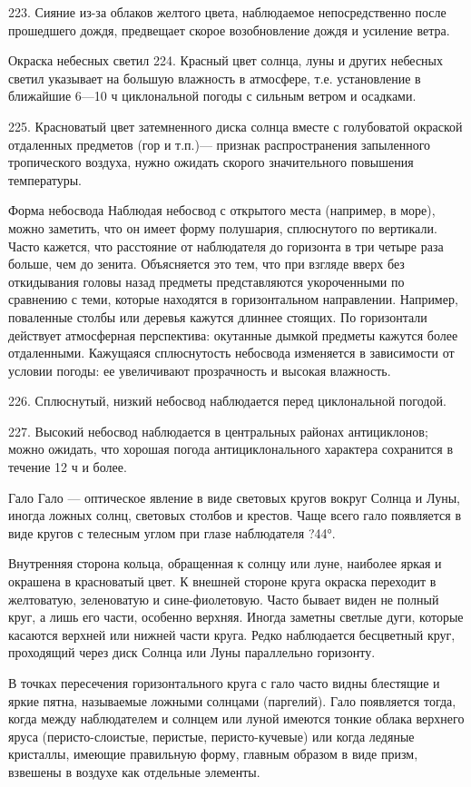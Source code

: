 223. Сияние из-за облаков желтого цвета, наблюдаемое непосредственно после прошедшего дождя, предвещает скорое возобновление дождя и усиление ветра.

Окраска небесных светил
224. Красный цвет солнца, луны и других небесных светил указывает на большую влажность в атмосфере, т.е. установление в ближайшие 6—10 ч циклональной погоды с сильным ветром и осадками.

225. Красноватый цвет затемненного диска солнца вместе с голубоватой окраской отдаленных предметов (гор и т.п.)— признак распространения запыленного тропического воздуха, нужно ожидать скорого значительного повышения температуры.

Форма небосвода
Наблюдая небосвод с открытого места (например, в море), можно заметить, что он имеет форму полушария, сплюснутого по вертикали. Часто кажется, что расстояние от наблюдателя до горизонта в три четыре раза больше, чем до зенита. Объясняется это тем, что при взгляде вверх без откидывания головы назад предметы представляются укороченными по сравнению с теми, которые находятся в горизонтальном направлении.
Например, поваленные столбы или деревья кажутся длиннее стоящих. По горизонтали действует атмосферная перспектива: окутанные дымкой предметы кажутся более отдаленными. Кажущаяся сплюснутость небосвода изменяется в зависимости от условии погоды: ее увеличивают прозрачность и высокая влажность.

226. Сплюснутый, низкий небосвод наблюдается перед циклональной погодой.

227. Высокий небосвод наблюдается в центральных районах антициклонов; можно ожидать, что хорошая погода антициклонального характера сохранится в течение 12 ч и более.

Гало
Гало --- оптическое явление в виде световых кругов вокруг Солнца и Луны, иногда ложных солнц, световых столбов и крестов. Чаще всего гало появляется в виде кругов с телесным углом при глазе наблюдателя ?44°.

Внутренняя сторона кольца, обращенная к солнцу или луне, наиболее яркая и окрашена в красноватый цвет. К внешней стороне круга окраска переходит в желтоватую, зеленоватую и сине-фиолетовую. Часто бывает виден не полный круг, а лишь его части, особенно верхняя. Иногда заметны светлые дуги, которые касаются верхней или нижней части круга. Редко наблюдается бесцветный круг, проходящий через диск Солнца или Луны параллельно горизонту.

В точках пересечения горизонтального круга с гало часто видны блестящие и яркие пятна, называемые ложными солнцами (паргелий). Гало появляется тогда, когда между наблюдателем и солнцем или луной имеются тонкие облака верхнего яруса (перисто-слоистые, перистые, перисто-кучевые) или когда ледяные кристаллы, имеющие правильную форму, главным образом в виде призм, взвешены в воздухе как отдельные элементы.

